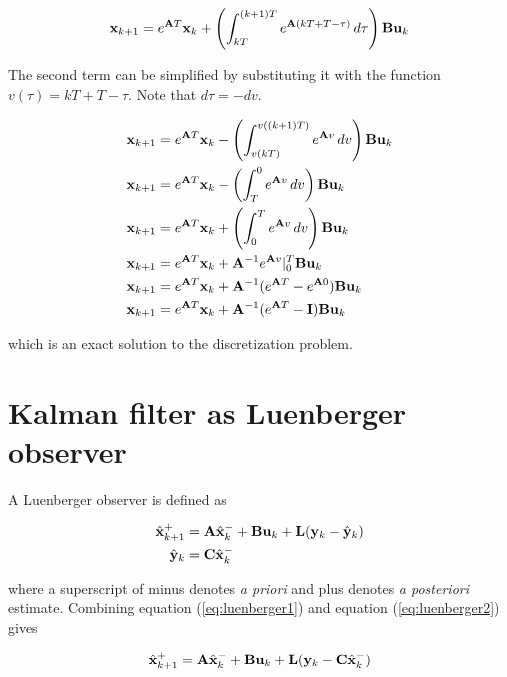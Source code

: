 \begin{equation*}
  \mathbf{x}_{k+1} = e^{\mathbf{A}T}\mathbf{x}_k +
    \left(\int_{kT}^{(k + 1)T} e^{\mathbf{A}(kT + T - \tau)} \,d\tau\right)
    \mathbf{B}\mathbf{u}_k
\end{equation*}

The second term can be simplified by substituting it with the function
$v(\tau) = kT + T - \tau$. Note that $d\tau = -dv$.

\begin{align*}
  \mathbf{x}_{k+1} &= e^{\mathbf{A}T}\mathbf{x}_k -
    \left(\int_{v(kT)}^{v((k + 1)T)} e^{\mathbf{A}v} \,dv\right)
    \mathbf{B}\mathbf{u}_k \\
  \mathbf{x}_{k+1} &= e^{\mathbf{A}T}\mathbf{x}_k -
    \left(\int_T^0 e^{\mathbf{A}v} \,dv\right) \mathbf{B}\mathbf{u}_k \\
  \mathbf{x}_{k+1} &= e^{\mathbf{A}T}\mathbf{x}_k +
    \left(\int_0^T e^{\mathbf{A}v} \,dv\right) \mathbf{B}\mathbf{u}_k \\
  \mathbf{x}_{k+1} &= e^{\mathbf{A}T}\mathbf{x}_k +
    \mathbf{A}^{-1}e^{\mathbf{A}v} \rvert_0^T \mathbf{B}\mathbf{u}_k \\
  \mathbf{x}_{k+1} &= e^{\mathbf{A}T}\mathbf{x}_k +
    \mathbf{A}^{-1}(e^{\mathbf{A}T} - e^{\mathbf{A}0}) \mathbf{B}\mathbf{u}_k \\
  \mathbf{x}_{k+1} &= e^{\mathbf{A}T}\mathbf{x}_k +
    \mathbf{A}^{-1}(e^{\mathbf{A}T} - \mathbf{I}) \mathbf{B}\mathbf{u}_k
\end{align*}

which is an exact solution to the \gls{discretization} problem.

\section{Kalman filter as Luenberger observer}
\label{sec:deriv_kalman_luenberger}

A Luenberger \gls{observer} is defined as

\begin{align}
  \hat{\mathbf{x}}_{k+1}^+ &= \mathbf{A}\hat{\mathbf{x}}_k^- + \mathbf{B}\mathbf{u}_k + \mathbf{L}
    (\mathbf{y}_k - \hat{\mathbf{y}}_k) \label{eq:luenberger1} \\
  \hat{\mathbf{y}}_k &= \mathbf{C} \hat{\mathbf{x}}_k^- \label{eq:luenberger2}
\end{align}

where a superscript of minus denotes \textit{a priori} and plus denotes
\textit{a posteriori} estimate. Combining equation (\ref{eq:luenberger1}) and
equation (\ref{eq:luenberger2}) gives

\begin{equation} \label{eq:luenberger}
  \hat{\mathbf{x}}_{k+1}^+ = \mathbf{A}\hat{\mathbf{x}}_k^- + \mathbf{B}\mathbf{u}_k + \mathbf{L}
    (\mathbf{y}_k - \mathbf{C}\hat{\mathbf{x}}_k^-)
\end{equation}

